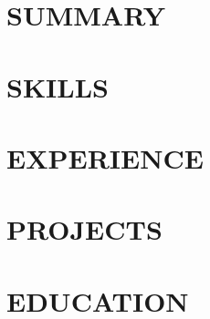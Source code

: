 \documentclass[letter,11pt]{article}
\begin{document}
\section{SUMMARY}


\section{SKILLS}
\vspace{2pt}

\vspace{-2pt}

\section{EXPERIENCE}

\vfill

\section{PROJECTS}

\vfill

\section{EDUCATION}

\end{document}
